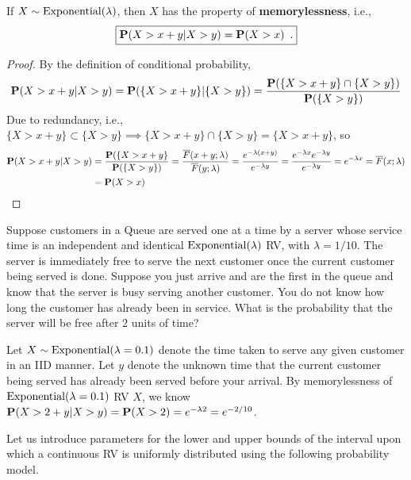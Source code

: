\begin{prop}\label{P:memorylessnessOfExponentialLambdaRV}
If $X \sim \mbox{{\rm Exponential}}(\lambda)$, then $X$ has the property of {\bf memorylessness}, i.e., 
\begin{equation}
\boxed
{
\mathbf{P}(X>x+y  | X > y) = \mathbf{P} (X > x) \enspace .
} 
\end{equation}
\end{prop}
\begin{proof}
By the definition of conditional probability,
\[
\mathbf{P}(X > x+y | X > y) =\mathbf{P}( \{X>x+y\} |  \{X > y \}) = \frac{\mathbf{P}( \{X>x+y\} \cap \{X > y \})}{\mathbf{P}( \{X>y\} )}
\]
Due to redundancy, i.e., $\{X>x+y\} \subset \{X > y \} \implies \{X>x+y\} \cap \{X > y \}=\{X>x+y\}$, so
\begin{align*}
\mathbf{P}(X > x+y | X > y) 
&=  \frac{\mathbf{P}( \{X>x+y\}}{\mathbf{P}( \{X>y\} )} = \frac{\overline{F}(x+y; \lambda)}{\overline{F}(y; \lambda)} = \frac{e^{-\lambda(x+y)}}{e^{-\lambda y}} 
= \frac{e^{-\lambda x} e^{-\lambda y}}{e^{-\lambda y}}
= e^{-\lambda x} = \overline{F}(x; \lambda) \\
&= \mathbf{P}(X > x)
\end{align*}
\end{proof}

\begin{Exercise}[title={Memoryless Server Times},label={xmemorylessnessOfExponentialLambdaRV}]
Suppose customers in a Queue are served one at a time by a server whose service time is an independent and identical $\mbox{{\rm Exponential}}(\lambda)$ RV, with $\lambda=1/10$. The server is immediately free to serve the next customer once the current customer being served is done.
Suppose you just arrive and are the first in the queue and know that the server is busy serving another customer. You do not know how long the customer has already been in service. 
What is the probability that the server will be free after $2$ units of time?
\end{Exercise}
\begin{Answer}
Let $X \sim \mbox{{\rm Exponential}}(\lambda=0.1)$ denote the time taken to serve any given customer in an IID manner.
Let $y$ denote the unknown time that the current customer being served has already been served before your arrival.
By memorylessness of $\mbox{{\rm Exponential}}(\lambda=0.1)$ RV $X$, we know $\mathbf{P}(X > 2 + y | X > y) = \mathbf{P}(X > 2) = e^{-\lambda 2} = e^{-2/10}$.
\end{Answer}

\bigskip

Let us introduce parameters for the lower and upper bounds of the interval upon which a continuous RV is uniformly distributed using the following probability model.
 
